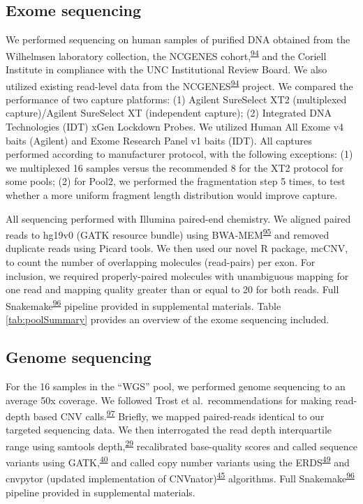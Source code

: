 \documentclass[11pt,letterpaper]{book}
\begin{document}
\hypertarget{exome-sequencing}{%
\subsection{Exome sequencing}\label{exome-sequencing}}

We performed sequencing on human samples of purified DNA obtained from the Wilhelmsen laboratory collection, the NCGENES cohort,\textsuperscript{\protect\hyperlink{ref-foreman:2013aa}{94}} and the Coriell Institute in compliance with the UNC Institutional Review Board.
We also utilized existing read-level data from the NCGENES\textsuperscript{\protect\hyperlink{ref-foreman:2013aa}{94}} project.
We compared the performance of two capture platforms: (1) Agilent SureSelect XT2 (multiplexed capture)/Agilent SureSelect XT (independent capture); (2) Integrated DNA Technologies (IDT) xGen Lockdown Probes.
We utilized Human All Exome v4 baits (Agilent) and Exome Research Panel v1 baits (IDT).
All captures performed according to manufacturer protocol, with the following exceptions: (1) we multiplexed 16 samples versus the recommended 8 for the XT2 protocol for some pools; (2) for Pool2, we performed the fragmentation step 5 times, to test whether a more uniform fragment length distribution would improve capture.

All sequencing performed with Illumina paired-end chemistry.
We aligned paired reads to hg19v0 (GATK resource bundle) using BWA-MEM\textsuperscript{\protect\hyperlink{ref-li:2013ab}{95}} and removed duplicate reads using Picard tools.
We then used our novel R package, mcCNV, to count the number of overlapping molecules (read-pairs) per exon.
For inclusion, we required properly-paired molecules with unambiguous mapping for one read and mapping quality greater than or equal to 20 for both reads.
Full Snakemake\textsuperscript{\protect\hyperlink{ref-koster:2012aa}{96}} pipeline provided in supplemental materials.
Table \ref{tab:poolSummary} provides an overview of the exome sequencing included.

\hypertarget{genome-sequencing}{%
\subsection{Genome sequencing}\label{genome-sequencing}}

For the 16 samples in the ``WGS'' pool, we performed genome sequencing to an average 50x coverage.
We followed Trost et al.~recommendations for making read-depth based CNV calls.\textsuperscript{\protect\hyperlink{ref-trost:2018aa}{97}}
Briefly, we mapped paired-reads identical to our targeted sequencing data.
We then interrogated the read depth interquartile range using samtools depth,\textsuperscript{\protect\hyperlink{ref-li:2009aa}{29}} recalibrated base-quality scores and called sequence variants using GATK,\textsuperscript{\protect\hyperlink{ref-van-der-auwera:2013aa}{40}} and called copy number variants using the ERDS\textsuperscript{\protect\hyperlink{ref-zhu:2012aa}{49}} and cnvpytor (updated implementation of CNVnator)\textsuperscript{\protect\hyperlink{ref-abyzov:2011aa}{45}} algorithms.
Full Snakemake\textsuperscript{\protect\hyperlink{ref-koster:2012aa}{96}} pipeline provided in supplemental materials.
\end{document}
